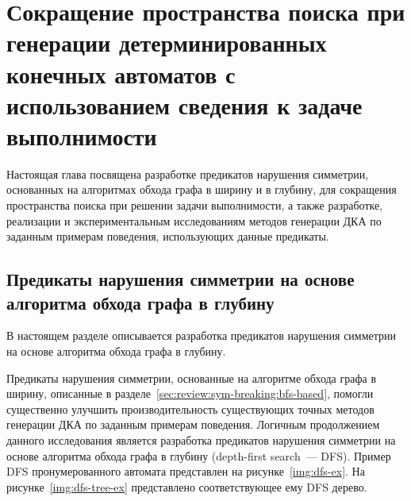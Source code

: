 
\chapter{Сокращение пространства поиска при генерации детерминированных конечных автоматов с использованием сведения к задаче выполнимости}
\label{sec:space}

Настоящая глава посвящена разработке предикатов нарушения симметрии, основанных на алгоритмах обхода графа в ширину и в глубину, для сокращения пространства поиска при решении задачи выполнимости, а также разработке, реализации и экспериментальным исследованиям методов генерации ДКА по заданным примерам поведения, использующих данные предикаты.


\section{Предикаты нарушения симметрии на основе алгоритма обхода графа в глубину}
\label{sec:space:dfs}

В настоящем разделе описывается разработка предикатов нарушения симметрии на основе алгоритма обхода графа в глубину.

Предикаты нарушения симметрии, основанные на алгоритме обхода графа в ширину, описанные в разделе~\ref{sec:review:sym-breaking:bfs-based}, помогли существенно улучшить производительность существующих точных методов генерации ДКА по заданным примерам поведения.
Логичным продолжением данного исследования является разработка предикатов нарушения симметрии на основе алгоритма обхода графа в глубину (depth-first search~--- DFS).
Пример DFS пронумерованного автомата представлен на рисунке~\ref{img:dfs-ex}.
На рисунке~\ref{img:dfs-tree-ex} представлено соответствующее ему DFS дерево.

